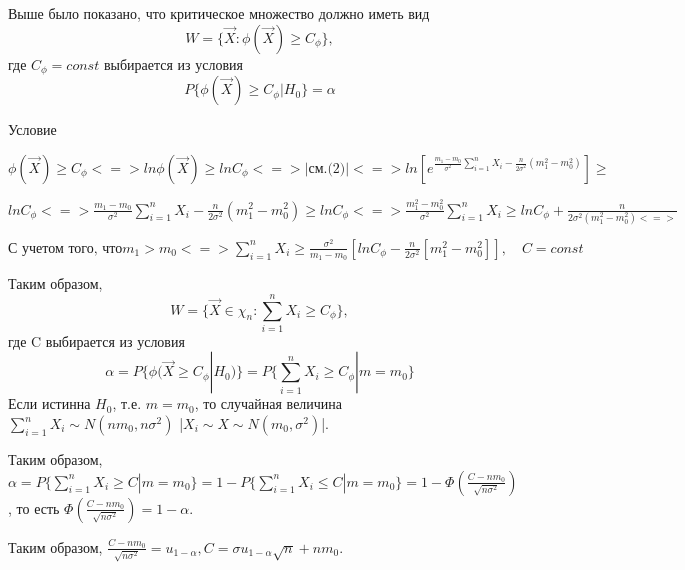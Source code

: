 \documentclass[a4paper, 12pt]{article}
\theoremstyle{definition}
\theoremstyle{leads}
\theoremstyle{example}
\theoremstyle{remark}
\begin{document}
Выше было показано, что критическое множество должно иметь вид
\begin{equation*}
	W = \{\vec{X}: \phi(\vec{X}) \geq C_\phi\},
\end{equation*}
где $C_\phi = const$ выбирается из условия 
\begin{equation*}
	P\{\phi(\vec{X}) \geq C_\phi | H_0\} = \alpha
\end{equation*}

Условие 
\begin{center}
	\centering
	$\phi(\vec{X}) \geq C_\phi <=> ln \phi(\vec{X}) \geq ln C_\phi <=> |\text{см.(2)}| <=> ln[e^{\frac{m_1 - m_0}{\sigma^2} \sum_{i=1}^{n}X_i - \frac{n}{2\sigma^2}(m_1^2 - m_0^2)}] \geq$  
\end{center}
\begin{center}
	\centering
	$lnC_\phi <=> \frac{m_1 - m_0}{\sigma^2} \sum_{i=1}^{n} X_i - \frac{n}{2\sigma^2}(m_1^2 - m_0^2) \geq ln C_\phi <=> \frac{m_1^2 - m_0^2}{\sigma^2} \sum_{i=1}^{n}X_i \geq ln C_\phi  + \frac{n}{2 \sigma^2(m_1^2 - m_0^2) <=>}$
\end{center}
\begin{center}
	\centering
	$\text{С учетом того, что} m_1 > m_0 <=> \sum_{i=1}^{n} X_i \geq \frac{\sigma^2}{m_1 - m_0}[ln C_\phi - \frac{n}{2 \sigma^2}[m_1^2 - m_0^2]], \quad C = const$  
\end{center}
Таким образом, 
\begin{equation*}
W = \{\vec{X} \in \chi_n : \sum_{i=1}^{n} X_i \geq C_\phi\},
\end{equation*}
где C выбирается из условия
\begin{equation*}
	\alpha = P\{\phi(\vec{X} \geq C_\phi | H_0)\} = P\{\sum_{i=1}^{n} X_i \geq C_\phi | m = m_0\}
\end{equation*}
Если истинна $H_0$, т.е. $m = m_0$, то случайная величина $\sum_{i=1}^{n} X_i \sim N(nm_0, n\sigma^2)$ |$X_i \sim X \sim N(m_0, \sigma^2)$|.

Таким образом, $\alpha = P\{\sum_{i=1}^{n}X_i \geq C | m = m_0 \} = 1 - P\{\sum_{i=1}^{n}X_i \leq C | m = m_0\} = 1 - \Phi(\frac{C - nm_0}{\sqrt{n \sigma^2}})$, то есть $\Phi(\frac{C - nm_0}{\sqrt{n \sigma^2}}) = 1 - \alpha$.

Таким образом, $\frac{C - nm_0}{\sqrt{n\sigma^2}} = u_{1 - \alpha}, C = \sigma u_{1 - \alpha} \sqrt{n} + nm_0$.
\end{document}
